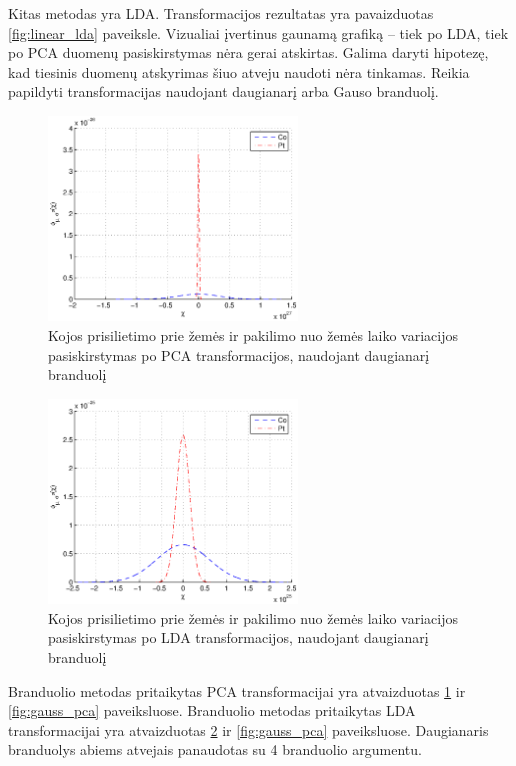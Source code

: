\documentclass[]{vgtuef}
\begin{document}
Kitas metodas yra LDA. Transformacijos rezultatas yra pavaizduotas \ref{fig:linear_lda} paveiksle. Vizualiai įvertinus gaunamą grafiką -- tiek po LDA, tiek po PCA duomenų pasiskirstymas nėra gerai atskirtas. Galima daryti hipotezę, kad tiesinis duomenų atskyrimas šiuo atveju naudoti nėra tinkamas. Reikia papildyti transformacijas naudojant daugianarį arba Gauso branduolį.

\begin{figure}[!t]
  \centering
  \includegraphics[width=250px]{figures/st_sw_poly_kpca.eps}
  \caption{Kojos prisilietimo prie žemės ir pakilimo nuo žemės laiko variacijos pasiskirstymas po PCA transformacijos, naudojant daugianarį branduolį}
  \label{fig:poly_pca}
\end{figure}

\begin{figure}[!t]
  \centering
  \includegraphics[width=250px]{figures/st_sw_poly_gda.eps}
  \caption{Kojos prisilietimo prie žemės ir pakilimo nuo žemės laiko variacijos pasiskirstymas po LDA transformacijos, naudojant daugianarį branduolį}
  \label{fig:poly_lda}
\end{figure}

Branduolio metodas pritaikytas PCA transformacijai yra atvaizduotas \ref{fig:poly_pca} ir \ref{fig:gauss_pca} paveiksluose. Branduolio metodas pritaikytas LDA transformacijai yra atvaizduotas \ref{fig:poly_lda} ir \ref{fig:gauss_pca} paveiksluose. Daugianaris branduolys abiems atvejais panaudotas su 4 branduolio argumentu.
\end{document}
